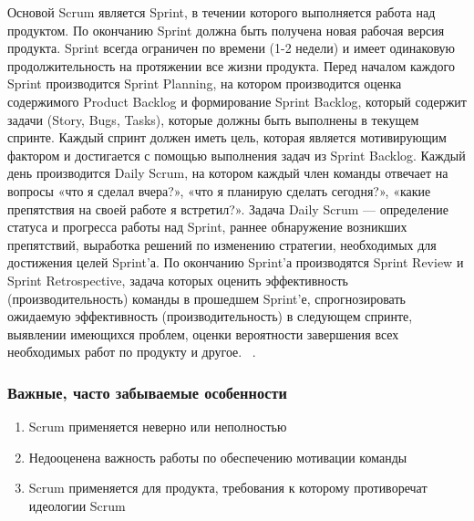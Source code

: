 \documentclass{../industrial-development}
\begin{document}
\lecturenotes
Основой Scrum является Sprint, в течении которого выполняется работа над продуктом. По окончанию Sprint должна быть получена новая рабочая версия продукта. Sprint всегда ограничен по времени (1-2 недели) и имеет одинаковую продолжительность на протяжении все жизни продукта. Перед началом каждого Sprint производится Sprint Planning, на котором производится оценка содержимого Product Backlog и формирование Sprint Backlog, который содержит задачи (Story, Bugs, Tasks), которые должны быть выполнены в текущем спринте. Каждый спринт должен иметь цель, которая является мотивирующим фактором и достигается с помощью выполнения задач из Sprint Backlog. Каждый день производится Daily Scrum, на котором каждый член команды отвечает на вопросы «что я сделал вчера?», «что я планирую сделать сегодня?», «какие препятствия на своей работе я встретил?». Задача Daily Scrum — определение статуса и прогресса работы над Sprint, раннее обнаружение возникших препятствий, выработка решений по изменению стратегии, необходимых для достижения целей Sprint'а. По окончанию Sprint'а производятся Sprint Review и Sprint Retrospective, задача которых оценить эффективность (производительность) команды в прошедшем Sprint'е, спрогнозировать ожидаемую эффективность (производительность) в следующем спринте, выявлении имеющихся проблем, оценки вероятности завершения всех необходимых работ по продукту и другое.  
~\cite{Fowler}.


\begin{frame} \frametitle{Важные, часто забываемые особенности}
\begin{enumerate}
	\item Scrum применяется неверно или неполностью 
	\item Недооценена важность работы по обеспечению мотивации команды 
	\item Scrum применяется для продукта, требования к которому противоречат идеологии Scrum
\end{enumerate}
\end{frame}
\end{document}
